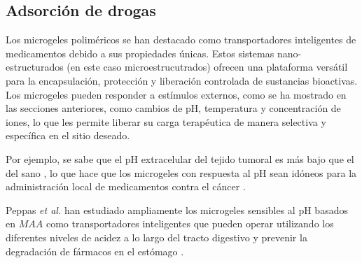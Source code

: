 \subsection{Adsorci\'on de drogas}\label{sec:gel:ads-drogas}


Los microgeles polim\'ericos se han destacado como transportadores inteligentes de medicamentos debido a sus propiedades \'unicas. Estos sistemas nano-estructurados (en este caso microestrucutrados) ofrecen una plataforma vers\'atil para la encapsulaci\'on, protecci\'on y liberaci\'on controlada de sustancias bioactivas. Los microgeles pueden responder a est\'imulos externos, como se ha mostrado en las secciones anteriores,  como cambios de pH, temperatura y concentraci\'on de iones, lo que les permite liberar su carga terap\'eutica de manera selectiva y espec\'ifica en el sitio deseado. 

Por ejemplo, se sabe que el pH extracelular del tejido tumoral es m\'as bajo que el del sano \cite{Gerweck1996}, lo que hace que los microgeles con respuesta al pH sean id\'oneos para la administraci\'on local de medicamentos contra el c\'ancer \cite{Dadsetan2013}.

Peppas \emph{et al.} han estudiado ampliamente los microgeles sensibles al pH basados en $MAA$ como transportadores inteligentes que pueden operar utilizando los diferentes niveles de acidez a lo largo del tracto digestivo y prevenir la degradaci\'on de f\'armacos en el est\'omago \cite{TorresLugo2002, Carr2010, DuranLobato2014, Sharpe2018}.

